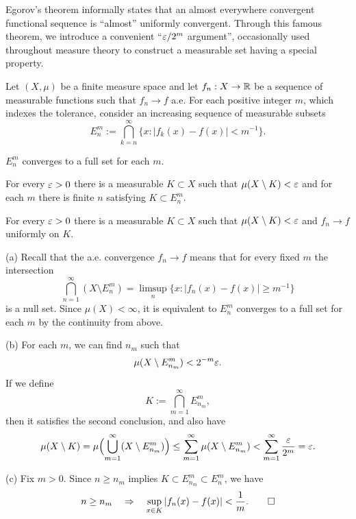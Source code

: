 \documentclass{../../large}
\begin{document}
\begin{prb}
Egorov's theorem informally states that an almost everywhere convergent functional sequence is ``almost'' uniformly convergent.
Through this famous theorem, we introduce a convenient ``$\varepsilon/2^m$ argument'', occasionally used throughout measure theory to construct a measurable set having a special property.

Let $(X,\mu)$ be a finite measure space and let $f_n:X\to\mathbb{R}$ be a sequence of measurable functions such that $f_n\to f$ a.e.
For each positive integer $m$, which indexes the tolerance, consider an increasing sequence of measurable subsets
\[E_n^m:=\bigcap_{k=n}^\infty\{x:|f_k(x)-f(x)|<m^{-1}\}.\]
\begin{parts}
\item $E_n^m$ converges to a full set for each $m$.
\item For every $\varepsilon>0$ there is a measurable $K\subset X$ such that $\mu(X\setminus K)<\varepsilon$ and for each $m$ there is finite $n$ satisfying $K\subset E_n^m$.
\item For every $\varepsilon>0$ there is a measurable $K\subset X$ such that $\mu(X\setminus K)<\varepsilon$ and $f_n\to f$ uniformly on $K$.
\end{parts}
\end{prb}
\begin{pf}
(a)
Recall that the a.e. convergence $f_n\to f$ means that for every fixed $m$ the intersection
\[\bigcap_{n=1}^\infty(X\setminus E_n^m)=\limsup_n\{x:|f_n(x)-f(x)|\ge m^{-1}\}\]
is a null set.
Since $\mu(X)<\infty$, it is equivalent to $E_n^m$ converges to a full set for each $m$ by the continuity from above.

(b)
For each $m$, we can find $n_m$ such that
\[\mu(X\setminus E_{n_m}^m)<2^{-m}\varepsilon.\]
If we define
\[K:=\bigcap_{m=1}^\infty E_{n_m}^m,\]
then it satisfies the second conclusion, and also have
\[\mu(X\setminus K)=\mu\Bigl(\bigcup_{m=1}^\infty(X\setminus E_{n_m}^m)\Bigr)\le\sum_{m=1}^\infty\mu(X\setminus E_{n_m}^m)<\sum_{m=1}^\infty\frac{\varepsilon}{2^m}=\varepsilon.\]


(c)
Fix $m>0$.
Since $n\ge n_m$ implies $K\subset E_{n_m}^m\subset E_n^m$, we have
\[n\ge n_m\quad\Rightarrow\quad\sup_{x\in K}|f_n(x)-f(x)|<\frac1m.\qedhere\]
\end{pf}
\end{document}
